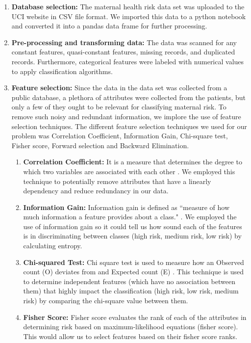 \documentclass[conference]{IEEEtran}
\begin{document}
\begin{enumerate}
    \item \textbf{Database selection: } The maternal health risk data set was uploaded to the UCI website in CSV file format. We imported this data to a python notebook and converted it into a pandas data frame for further processing.
    \item \textbf{Pre-processing and transforming data:} The data was scanned for any constant features, quasi-constant features, missing records, and duplicated records. Furthermore, categorical features were labeled with numerical values to apply classification algorithms.
    \item \textbf{Feature selection:} Since the data in the data set was collected from a public database, a plethora of attributes were collected from the patients, but only a few of they ought to be relevant for classifying maternal risk. To remove such noisy and redundant information, we implore the use of feature selection techniques. The different feature selection techniques we used for our problem was Correlation Coefficient, Information Gain, Chi-square test, Fisher score, Forward selection and Backward Elimination.
    \begin{enumerate}
        \item \textbf{Correlation Coefficient:} It is a measure that determines the degree to which two variables are associated with each other \cite{corrcoeff}. We employed this technique to potentially remove attributes that have a linearly dependency and reduce redundancy in our data.
        \item \textbf{Information Gain: } Information gain is defined as ``measure of how much information a feature provides about a class." \cite{infogain}. We employed the use of information gain so it could tell us how sound each of the features is in discriminating between classes (high risk, medium risk, low risk) by calculating entropy.
        \item \textbf{Chi-squared Test: } Chi square test is used to measure how an Observed count (O) deviates from and Expected count (E) \cite{chi2}. This technique is used to determine independent features (which have no association between them) that highly impact the classification (high risk, low risk, medium risk) by comparing the chi-square value between them.
        \item \textbf{Fisher Score: } Fisher score evaluates the rank of each of the attributes in determining risk based on maximum-likelihood equations (fisher score). This would allow us to select features based on their fisher score ranks.

\end{enumerate}
\end{enumerate}
\end{document}
